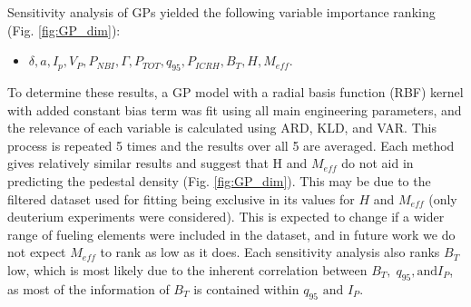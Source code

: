 \documentclass[a4paper, twoside, final, 12pt]{article}
\begin{document}
{Sensitivity analysis of GPs yielded the following variable importance ranking (Fig. \ref{fig:GP_dim}): 
\begin{itemize}
	\item  $\delta, a, I_p, V_P, P_{NBI},\Gamma, P_{TOT},  q_{95},  P_{ICRH}, B_T, H, M_{eff}$. 
\end{itemize}
To determine these results, a GP model with a radial basis function (RBF) kernel with added constant bias term was fit using all main engineering parameters, and the relevance of each variable is calculated using ARD, KLD, and VAR. This process is repeated 5 times and the results over all 5 are averaged. Each method gives relatively similar results and suggest that H and $M_{eff}$ do not aid in predicting the pedestal density (Fig. \ref{fig:GP_dim}). This may be due to the filtered dataset used for fitting being exclusive in its values for $H$ and $M_{eff}$ (only deuterium experiments were considered). This is expected to change if a wider range of fueling elements were included in the dataset, and in future work we do not expect $M_{eff}$ to rank as low as it does. Each sensitivity analysis also ranks $B_T$ low, which is most likely due to the inherent correlation between $B_T, \; q_{95}, \text{and} I_P$, as most of the information of $B_T$ is contained within $q_{95} \text{ and } I_P$. 

}
\end{document}
